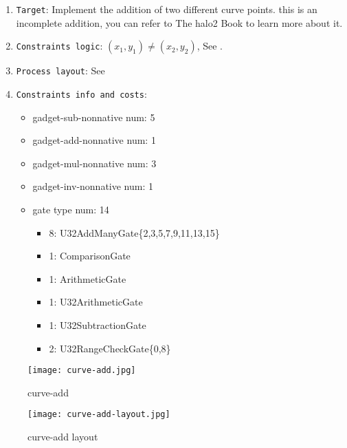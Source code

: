 
\begin{enumerate}
    \item \verb|Target|: Implement the addition of two different curve points. this is an incomplete addition, you can refer to The halo2 Book \cite{website:halo2-book} to learn more about it.
    \item \verb|Constraints logic|: $(x_1,y_1) \ne (x_2,y_2)$, See .
    \item \verb|Process layout|: See 
    \item \verb|Constraints info and costs|:
    \begin{itemize}
        \item gadget-sub-nonnative num: 5
        \item gadget-add-nonnative num: 1
        \item gadget-mul-nonnative num: 3
        \item gadget-inv-nonnative num: 1
        \item gate type num: 14
            \begin{itemize}
                \item 8: U32AddManyGate\{2,3,5,7,9,11,13,15\}
                \item 1: ComparisonGate
                \item 1: ArithmeticGate
                \item 1: U32ArithmeticGate
                \item 1: U32SubtractionGate
                \item 2: U32RangeCheckGate\{0,8\}
            \end{itemize}
    \end{itemize}
\end{enumerate}

\begin{figure}[!ht]
    \centering
    \texttt{[image: curve-add.jpg]}
    \caption{curve-add}
    \label{fig:curve-add}
\end{figure}

\begin{figure}[!ht]
    \centering
    \texttt{[image: curve-add-layout.jpg]}
    \caption{curve-add layout}
    \label{fig:curve-add-layout}
\end{figure}
